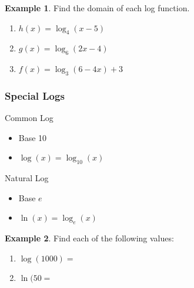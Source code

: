 \documentclass[addpoints,12pt]{exam}
\theoremstyle{definition}
\theoremstyle{break}
\theoremstyle{break}
\newtheorem{example}{Example}[subsection]
\begin{document}
\newpage

\begin{example}
Find the domain of each log function.
\begin{enumerate}
\item $h(x) = \log_4{(x-5)}$
\vspace{1.75in}
\item $g(x) = \log_6{(2x - 4)}$
\vspace{1.75in}
\item $f(x) = \log_3{(6-4x)} + 3$
\end{enumerate}
\end{example}

\newpage

\subsubsection*{Special Logs}
\begin{enumerate}
\begin{minipage}{.5\textwidth}
\item Common Log
\begin{itemize}
\item Base 10
\item $\log{(x)} = \log_{10}{(x)}$
\end{itemize}
\end{minipage}%
\begin{minipage}{.5\textwidth}
\item Natural Log
\begin{itemize}
\item Base $e$
\item $\ln{(x)} = \log_{e}{(x)}$
\end{itemize}
\end{minipage}%
\end{enumerate}
\vspace{.15in}

\begin{example}
Find each of the following values:
\begin{enumerate}
\item $\log{(1000)} = $
\vspace{.5in}
\item $\ln{(50} = $
\vspace{.5in}
\end{enumerate}
\end{example}
\end{document}
